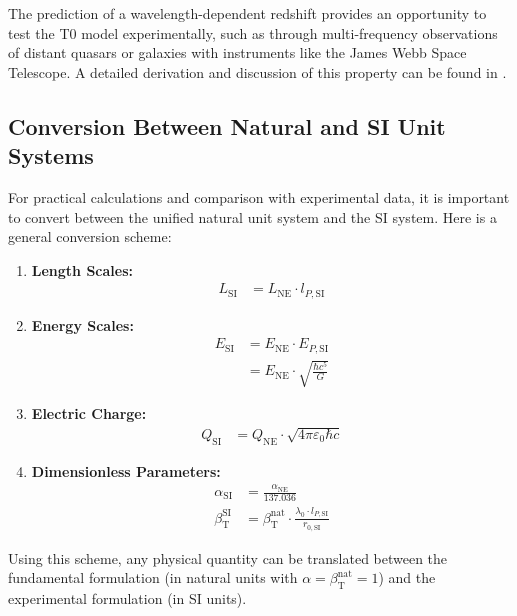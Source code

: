 ﻿\documentclass[12pt,a4paper]{article}
\newcommand{\betaT}{\beta_{\text{T}}}
\begin{document}
	The prediction of a wavelength-dependent redshift provides an opportunity to test the T0 model experimentally, such as through multi-frequency observations of distant quasars or galaxies with instruments like the James Webb Space Telescope. A detailed derivation and discussion of this property can be found in \cite{pascher_emergente_gravitation_2025}.
	
	\subsection{Conversion Between Natural and SI Unit Systems}
	
	For practical calculations and comparison with experimental data, it is important to convert between the unified natural unit system and the SI system. Here is a general conversion scheme:
	
	\begin{tcolorbox}[colback=blue!5!white,colframe=blue!75!black,title=Conversion Scheme for Natural and SI Units]
		\begin{enumerate}
			\item \textbf{Length Scales:}
			\begin{align}
				L_{\text{SI}} &= L_{\text{NE}} \cdot l_{P,\text{SI}}
			\end{align}
			\item \textbf{Energy Scales:}
			\begin{align}
				E_{\text{SI}} &= E_{\text{NE}} \cdot E_{P,\text{SI}} \\
				&= E_{\text{NE}} \cdot \sqrt{\frac{\hbar c^5}{G}}
			\end{align}
			\item \textbf{Electric Charge:}
			\begin{align}
				Q_{\text{SI}} &= Q_{\text{NE}} \cdot \sqrt{4\pi\varepsilon_0 \hbar c}
			\end{align}
			\item \textbf{Dimensionless Parameters:}
			\begin{align}
				\alpha_{\text{SI}} &= \frac{\alpha_{\text{NE}}}{137.036} \\
				\betaT^{\text{SI}} &= \betaT^{\text{nat}} \cdot \frac{\lambda_0 \cdot l_{P,\text{SI}}}{r_{0,\text{SI}}}
			\end{align}
		\end{enumerate}
	\end{tcolorbox}
	
	Using this scheme, any physical quantity can be translated between the fundamental formulation (in natural units with \(\alpha = \betaT^{\text{nat}} = 1\)) and the experimental formulation (in SI units).
	
\end{document}
